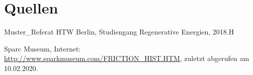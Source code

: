 \section{Quellen}

\begin{thebibliography}{1}

	
	 Muster\_Referat HTW Berlin, Studiengang Regenerative Energien, 2018.H
	
	 Sparc Museum, Internet: \url{http://www.sparkmuseum.com/FRICTION_HIST.HTM}, zuletzt abgerufen am 10.02.2020.	
	
\end{thebibliography}